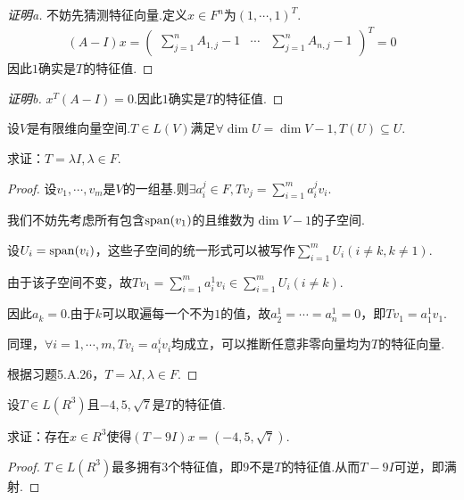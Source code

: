\begin{proof}[证明a]
    不妨先猜测特征向量.定义\(x \in F^n\)为\((1,\cdots,1)^T\).
    \begin{align*}
        (A-I)x=
            \begin{pmatrix}
                \sum_{j=1}^n A_{1,j}-1 & \cdots & \sum_{j=1}^n A_{n,j}-1
            \end{pmatrix}^T
            =0
    \end{align*}
    因此\(1\)确实是\(T\)的特征值.
\end{proof}

\begin{proof}[证明b]
    \(x^T(A-I)=0\).因此\(1\)确实是\(T\)的特征值.
\end{proof}

\begin{problem}[28]\label{5.A.28}
    设\(V\)是有限维向量空间.\(T \in L(V)\)满足\(\forall \dim U=\dim V-1,T(U) \subseteq U\).
    
    求证：\(T=\lambda I,\lambda \in F\).
\end{problem}

\begin{proof}
    设\(v_1,\cdots,v_m\)是\(V\)的一组基.则\(\exists a_i^j \in F,Tv_j=\sum_{i=1}^m a_i^j v_i\).

    我们不妨先考虑所有包含\(\operatorname{span} (v_1)\)的且维数为\(\dim V-1\)的子空间.
    
    设\(U_i=\operatorname{span} (v_i)\)，这些子空间的统一形式可以被写作\(\sum_{i=1}^m U_i(i \ne k,k \ne 1)\).
    
    由于该子空间不变，故\(Tv_1=\sum_{i=1}^m a_i^1 v_i \in \sum_{i=1}^m U_i(i \ne k)\).
    
    因此\(a_{k}=0\).由于\(k\)可以取遍每一个不为\(1\)的值，故\(a_2^1=\cdots=a_n^1=0\)，即\(Tv_1=a_1^1 v_1\).
    
    同理，\(\forall i=1,\cdots,m,Tv_i=a_i^i v_i\)均成立，可以推断任意非零向量均为\(T\)的特征向量.
    
    根据习题5.A.26，\(T=\lambda I,\lambda \in F\).%
\end{proof}

\begin{problem}[30]\label{5.A.30}
    设\(T \in L(R^3)\)且\(-4,5,\sqrt{7}\)是\(T\)的特征值.

    求证：存在\(x \in R^3\)使得\((T-9I)x=(-4,5,\sqrt{7})\).
\end{problem}

\begin{proof}
    \(T \in L(R^3)\)最多拥有\(3\)个特征值，即\(9\)不是\(T\)的特征值.从而\(T-9I\)可逆，即满射.
\end{proof}

